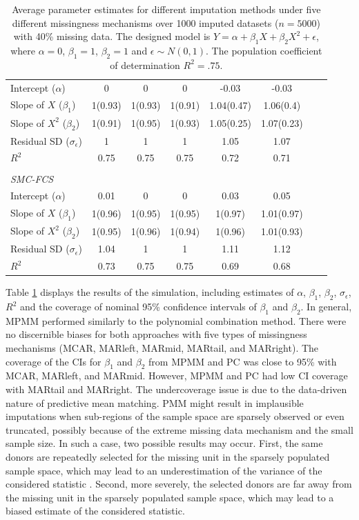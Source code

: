 \begin{table}[ht!]
{\begin{tabular}{lcccccrl}
				Intercept ($\alpha$)				&0		&0	&0	&-0.03	&-0.03\\
				Slope of $X$ ($\beta_1$)			&1(0.93)		&1(0.93)		&1(0.91)		&1.04(0.47)	&1.06(0.4)\\	
				Slope of $X^2$ ($\beta_2$)		&1(0.91)		&1(0.95)		&1(0.93)	&1.05(0.25)	&1.07(0.23)\\	
				Residual SD ($\sigma_\epsilon$) 	&1		&1		&1		&1.05	&1.07\\	
				$R^2$						&0.75	&0.75	&0.75	&0.72	&0.71\\\\
				\textit{SMC-FCS}	&&&&&\\
				Intercept ($\alpha$)				&0.01	&0	&0	&0.03	&0.05\\
				Slope of $X$ ($\beta_1$)			&1(0.96)	&1(0.95)	&1(0.95)	&1(0.97)	&1.01(0.97)\\
				Slope of $X^2$ ($\beta_2$)		&1(0.95)	&1(0.96)	&1(0.94)	&1(0.96)	&1.01(0.93)\\
				Residual SD ($\sigma_\epsilon$) 	&1.04	&1	&1	&1.11	&1.12\\
				$R^2$						&0.73	&0.75	&0.75		&0.69	&0.68\\\hline
			\end{tabular}
		}
		\caption{Average parameter estimates for different imputation methods under five different missingness mechanisms over 1000 imputed datasets ($n=5000$) with 40\% missing data. The designed model is $Y = \alpha + \beta_1X + \beta_2 X^2 + \epsilon$, where $\alpha=0$, $\beta_1=1$, $\beta_2=1$ and $\epsilon \sim N (0,1)$. The population coefficient of determination $R^2=.75$.}
		\label{tab3_2}
		
	\end{table}
	
	
	Table \ref{tab3_2} displays the results of the simulation, including estimates of $\alpha$, $\beta_1$, $\beta_2$, $\sigma_\epsilon$, $R^2$ and the coverage of nominal 95\% confidence intervals of $\beta_1$ and $\beta_2$. In general, MPMM performed similarly to the polynomial combination method. There were no discernible biases for both approaches with five types of missingness mechanisms (MCAR, MARleft, MARmid, MARtail, and MARright). The coverage of the CIs for $\beta_1$ and $\beta_2$ from MPMM and PC was close to 95\% with MCAR, MARleft, and MARmid. However, MPMM and PC had low CI coverage with MARtail and MARright. The undercoverage issue is due to the data-driven nature of predictive mean matching. PMM might result in implausible imputations when sub-regions of the sample space are sparsely observed or even truncated, possibly because of the extreme missing data mechanism and the small sample size. In such a case, two possible results may occur. First, the same donors are repeatedly selected for the missing unit in the sparsely populated sample space, which may lead to an underestimation of the variance of the considered statistic \citep{Jong2014}. Second, more severely, the selected donors are far away from the missing unit in the sparsely populated sample space, which may lead to a biased estimate of the considered statistic. 
	

